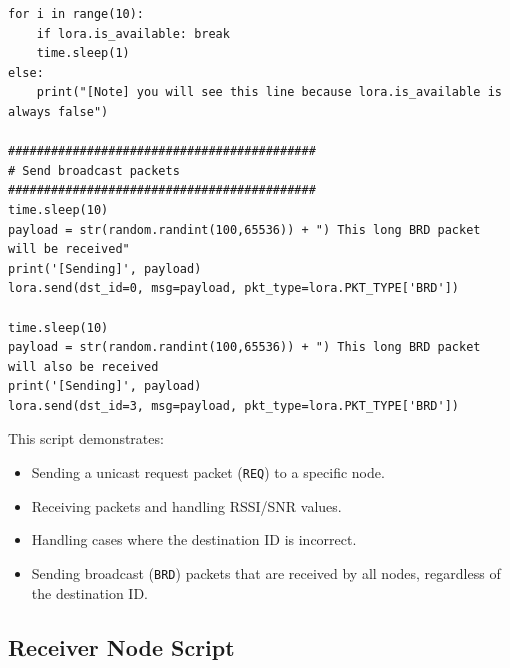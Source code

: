 {\begin{verbatim}
for i in range(10):
    if lora.is_available: break
    time.sleep(1)
else:
    print("[Note] you will see this line because lora.is_available is always false")

###########################################
# Send broadcast packets
###########################################
time.sleep(10)
payload = str(random.randint(100,65536)) + ") This long BRD packet will be received"
print('[Sending]', payload)
lora.send(dst_id=0, msg=payload, pkt_type=lora.PKT_TYPE['BRD'])

time.sleep(10)
payload = str(random.randint(100,65536)) + ") This long BRD packet will also be received 
print('[Sending]', payload)
lora.send(dst_id=3, msg=payload, pkt_type=lora.PKT_TYPE['BRD'])
\end{verbatim}
}
This script demonstrates:
\begin{itemize}
    \item Sending a unicast request packet (\texttt{REQ}) to a specific node.
    \item Receiving packets and handling RSSI/SNR values.
    \item Handling cases where the destination ID is incorrect.
    \item Sending broadcast (\texttt{BRD}) packets that are received by all nodes, regardless of the destination ID.
\end{itemize}

\subsection{Receiver Node Script}

